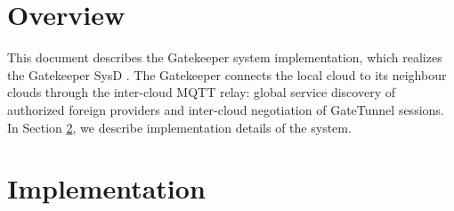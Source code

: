 \documentclass[a4paper]{arrowhead}
\begin{document}
\sloppy

\ArrowheadSetup

\begin{center}
  \vspace*{1cm}
  \huge{\arrowtitle}

  \vspace*{0.2cm}
  \LARGE{\arrowtype}
  \vspace*{1cm}

  \vspace*{\fill}


  \vspace*{1cm}
  \vspace*{\fill}

  \begin{abstract}
    This document describes the design and implementation of the Gatekeeper support system of Arrowhead 5.2.2 (\texttt{ah5-Gatekeeper-java-spring}).
  \end{abstract}

  \vspace*{1cm}
\end{center}

\newpage

\tableofcontents
\newpage

\section{Overview}
\label{sec:overview}

This document describes the Gatekeeper system implementation, which realizes the Gatekeeper SysD \cite{gk-sysd}. The Gatekeeper connects the local cloud to its neighbour clouds through the inter-cloud MQTT relay: global service discovery of authorized foreign providers and inter-cloud negotiation of GateTunnel sessions.
In Section \ref{Implementation}, we describe implementation details of the system.

\newpage

\section{Implementation}
\label{Implementation}
\end{document}
